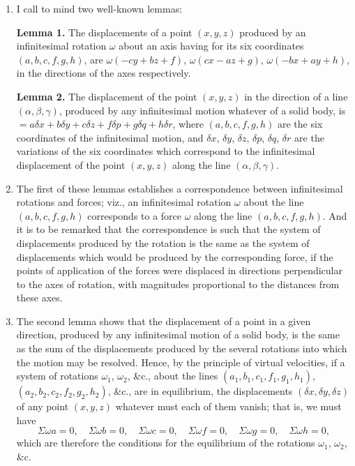 \documentclass[12pt,a4paper]{article}
\theoremstyle{plain}
\theoremstyle{definition}
\theoremstyle{remark}
\begin{document}
\begin{enumerate}[label=\arabic*.]
\item I call to mind two well-known lemmas:

\textbf{Lemma 1.} The displacements of a point $(x,y,z)$ produced by an infinitesimal rotation $\omega$ about an axis having for its six coordinates $(a,b,c,f,g,h)$, are $\omega(-cy+bz+f)$, $\omega(cx-az+g)$, $\omega(-bx+ay+h)$, in the directions of the axes respectively.

\textbf{Lemma 2.} The displacement of the point $(x,y,z)$ in the direction of a line $(\alpha, \beta, \gamma)$, produced by any infinitesimal motion whatever of a solid body, is $= a\delta x + b\delta y + c\delta z + f\delta p + g\delta q + h\delta r$, where $(a,b,c,f,g,h)$ are the six coordinates of the infinitesimal motion, and $\delta x$, $\delta y$, $\delta z$, $\delta p$, $\delta q$, $\delta r$ are the variations of the six coordinates which correspond to the infinitesimal displacement of the point $(x,y,z)$ along the line $(\alpha, \beta, \gamma)$.

\item The first of these lemmas establishes a correspondence between infinitesimal rotations and forces; viz., an infinitesimal rotation $\omega$ about the line $(a,b,c,f,g,h)$ corresponds to a force $\omega$ along the line $(a,b,c,f,g,h)$. And it is to be remarked that the correspondence is such that the system of displacements produced by the rotation is the same as the system of displacements which would be produced by the corresponding force, if the points of application of the forces were displaced in directions perpendicular to the axes of rotation, with magnitudes proportional to the distances from these axes.

\item The second lemma shows that the displacement of a point in a given direction, produced by any infinitesimal motion of a solid body, is the same as the sum of the displacements produced by the several rotations into which the motion may be resolved. Hence, by the principle of virtual velocities, if a system of rotations $\omega_1$, $\omega_2$, \&c., about the lines $(a_1,b_1,c_1,f_1,g_1,h_1)$, $(a_2,b_2,c_2,f_2,g_2,h_2)$, \&c., are in equilibrium, the displacements $(\delta x, \delta y, \delta z)$ of any point $(x,y,z)$ whatever must each of them vanish; that is, we must have
\[\Sigma \omega a = 0, \quad \Sigma \omega b = 0, \quad \Sigma \omega c = 0, \quad \Sigma \omega f = 0, \quad \Sigma \omega g = 0, \quad \Sigma \omega h = 0,\]
which are therefore the conditions for the equilibrium of the rotations $\omega_1$, $\omega_2$, \&c.


\end{enumerate}
\end{document}
